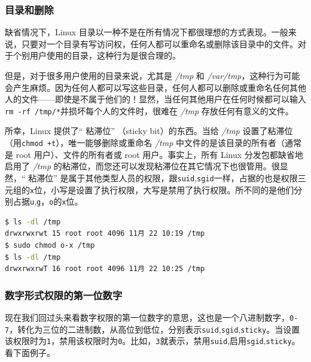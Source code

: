 \documentclass[doctor,openright,twoside]{sjtuthesis}
\newcommand{\passthrough}[1]{#1}
\theoremstyle{plain}
\theoremstyle{definition}
\theoremstyle{remark}
\theoremstyle{ocrenumbox}
\theoremstyle{plain}
\begin{document}
\hypertarget{section-66}{%
\subsubsection{目录和删除}\label{section-66}}

缺省情况下，Linux 目录以一种不是在所有情况下都很理想的方式表现。一般来说，只要对一个目录有写访问权，任何人都可以重命名或删除该目录中的文件。对于个别用户使用的目录，这种行为是很合理的。

但是，对于很多用户使用的目录来说，尤其是 \emph{/tmp} 和 \emph{/var/tmp}，这种行为可能会产生麻烦。因为任何人都可以写这些目录，任何人都可以删除或重命名任何其他人的文件------即使是不属于他们的！显然，当任何其他用户在任何时候都可以输入\passthrough{\lstinline!rm -rf /tmp/*!}并损坏每个人的文件时，很难在 \emph{/tmp} 存放任何有意义的文件。

所幸，Linux 提供了`` 粘滞位'' （sticky bit）的东西。当给 \emph{/tmp} 设置了粘滞位（用\passthrough{\lstinline!chmod +t!}），唯一能够删除或重命名 \emph{/tmp} 中文件的是该目录的所有者（通常是 root 用户）、文件的所有者或 root 用户。事实上，所有 Linux 分发包都缺省地启用了 \emph{/tmp} 的粘滞位，而您还可以发现粘滞位在其它情况下也很管用。很显然，`` 粘滞位'' 是属于其他类型人员的权限，跟\passthrough{\lstinline!suid!},\passthrough{\lstinline!sgid!}一样，占据的也是权限三元组的\passthrough{\lstinline!x!}位，小写是设置了执行权限，大写是禁用了执行权限。所不同的是他们分别占据\passthrough{\lstinline!u!},\passthrough{\lstinline!g!}，\passthrough{\lstinline!o!}的\passthrough{\lstinline!x!}位。

\begin{lstlisting}[language=bash]
$ ls -dl /tmp
drwxrwxrwt 15 root root 4096 11月 22 10:19 /tmp
$ sudo chmod o-x /tmp
$ ls -dl /tmp
drwxrwxrwT 16 root root 4096 11月 22 10:25 /tmp
\end{lstlisting}

\hypertarget{section-67}{%
\subsubsection{数字形式权限的第一位数字}\label{section-67}}

现在我们回过头来看数字权限的第一位数字的意思，这也是一个八进制数字，\passthrough{\lstinline!0-7!}，转化为三位的二进制数，从高位到低位，分别表示\passthrough{\lstinline!suid!},\passthrough{\lstinline!sgid!},\passthrough{\lstinline!sticky!}。当设置该权限时为\passthrough{\lstinline!1!}，禁用该权限时为\passthrough{\lstinline!0!}。比如，\passthrough{\lstinline!3!}就表示，禁用\passthrough{\lstinline!suid!},启用\passthrough{\lstinline!sgid!},\passthrough{\lstinline!sticky!}。看下面例子。
\end{document}
